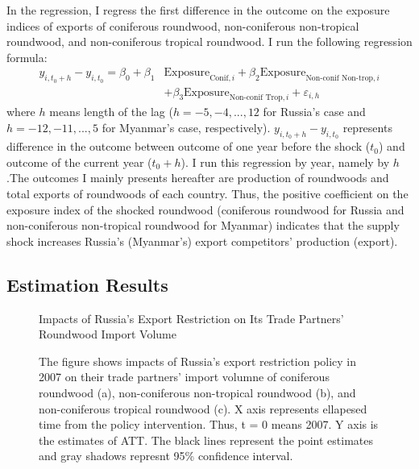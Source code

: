 \documentclass[a4paper,12pt]{article}
\begin{document}
In the regression, I regress the first difference in the outcome on the exposure indices of exports of coniferous roundwood, non-coniferous non-tropical roundwood, and non-coniferous tropical roundwood. I run the following regression formula:
\begin{align}
    y_{i, t_0 + h} - y_{i, t_0} = \beta_0 + \beta_1 &\text{Exposure}_{\text{Conif}, i} + \beta_2 \text{Exposure}_{\text{Non-conif Non-trop}, i} \nonumber \\
    &+ \beta_3 \text{Exposure}_{\text{Non-conif Trop}, i} + \varepsilon_{i, h}
\end{align}
where $h$ means length of the lag ($h = -5, -4, ..., 12$ for Russia's case and $h = -12, -11, ..., 5$ for Myanmar's case, respectively). $y_{i, t_0 + h} - y_{i, t_0}$ represents difference in the outcome between outcome of one year before the shock ($t_0$) and outcome of the current year ($t_0 + h$). I run this regression by year, namely by $h$.The outcomes I mainly presents hereafter are production of roundwoods and total exports of roundwoods of each country. Thus, the positive coefficient on the exposure index of the shocked roundwood (coniferous roundwood for Russia and non-coniferous non-tropical roundwood for Myanmar) indicates that the supply shock increases Russia's (Myanmar's) export competitors' production (export).

\subsection{Estimation Results}

\begin{figure}[H] 
    \centering
    \caption{Impacts of Russia's Export Restriction on Its Trade Partners' Roundwood Import Volume}
    \caption*{\small{The figure shows impacts of Russia's export restriction policy in 2007 on their trade partners' import volumne of coniferous roundwood (a), non-coniferous non-tropical roundwood (b), and non-coniferous tropical roundwood (c). X axis represents ellapesed time from the policy intervention. Thus, t = 0 means 2007. Y axis is the estimates of ATT. The black lines represent the point estimates and gray shadows represnt 95\% confidence interval.}}
    \label{fig:competitor_exp_Russia}
\end{figure}
\end{document}
